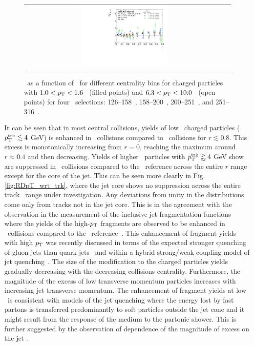 \begin{figure}
{\begin{tabular}{cc}
	 \includegraphics[width=0.45\textwidth]{figures_results/RDpT_dR_trk2_trk6_cent5} \\
\end{tabular} }
   \caption{\RDptr\ as a function of \rvar\ for different centrality bins for charged particles with \mbox{$1.0 < p_{\mathrm{T}} < 1.6$ \GeV}
(filled points) and $6.3 < p_{\mathrm{T}} < 10.0 $ \GeV\ (open points) for four \ptjet\ selections: 126--158~\GeV, 158--200~\GeV,
200--251~\GeV, and 251--316~\GeV.}
      \label{fig:ptjetdep}
\end{figure}



It can be seen that in most central collisions, yields of low \pt\ charged particles ($\mbox{$p_{\mathrm{T}}^{\mathrm{trk}}$} \lesssim 4$ GeV) is enhanced in \PbPb\ collisions compared to \pp\ collisions for $r \lesssim 0.8$. This excess is monotonically increasing from $r=0$, reaching the maximum around $r\approx0.4$ and then decreasing. Yields of higher \pt\ particles with $\mbox{$p_{\mathrm{T}}^{\mathrm{trk}}$} \gtrapprox 4$ GeV show are suppressed in \PbPb\ collisions compared to the \pp\ reference across the entire $r$ range except for the core of the jet. This can be seen more clearly in Fig.\ref{fig:RDpT_wrt_trk}, where the jet core shows no suppression across the entire track \pt\ range under investigation. Any deviations from unity in the \RDptr distributions come only from tracks not in the jet core. This is in the agreement with the observation in the measurement of the inclusive jet fragmentation functions where the yields of the high-$p_{\mathrm{T}}$ fragments are observed to be enhanced in \PbPb\ collisions compared to the \pp\ reference~\cite{ATLAS502FFConf}. This enhancement of fragment yields with high $p_{\mathrm{T}}$ was recently discussed in terms of the expected stronger quenching of  gluon jets than quark jets~\cite{Spousta:2015fca} and within a hybrid strong/weak coupling model of jet quenching~\cite{Hulcher:2017cpt}.  The size of the modification to the charged particles yields gradually decreasing with the  decreasing collisions centrality. Furthermore, the magnitude of the excess of low transverse momentum particles increases with increasing jet transverse momentum. The enhancement of fragment yields at low \pT\ is consistent with models of the jet quenching where the energy lost by fast partons is transferred predominantly to soft particles outside the jet cone and it might result from the response of the medium to the partonic shower. This is further suggested by the observation of dependence of the magnitude of excess on the jet \pt.

